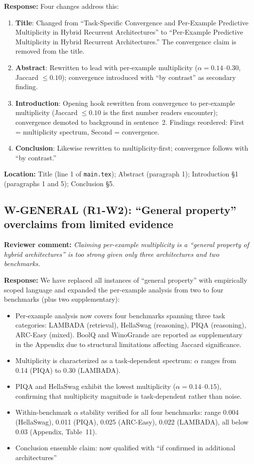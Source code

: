 \documentclass[11pt]{article}
\newcommand{\reviewer}[1]{\textcolor{reviewercolor}{\textbf{Reviewer comment:} \textit{#1}}}
\newcommand{\response}[1]{\textcolor{responsecolor}{\textbf{Response:} #1}}
\newcommand{\location}[1]{\textbf{Location:} #1}
\begin{document}
\response{Four changes address this:}
\begin{enumerate}[leftmargin=2em]
\item \textbf{Title}: Changed from ``Task-Specific Convergence and Per-Example Predictive Multiplicity in Hybrid Recurrent Architectures'' to ``Per-Example Predictive Multiplicity in Hybrid Recurrent Architectures.'' The convergence claim is removed from the title.
\item \textbf{Abstract}: Rewritten to lead with per-example multiplicity ($\alpha = 0.14$--$0.30$, Jaccard $\leq 0.10$); convergence introduced with ``by contrast'' as secondary finding.
\item \textbf{Introduction}: Opening hook rewritten from convergence to per-example multiplicity (Jaccard $\leq 0.10$ is the first number readers encounter); convergence demoted to background in sentence~2. Findings reordered: First = multiplicity spectrum, Second = convergence.
\item \textbf{Conclusion}: Likewise rewritten to multiplicity-first; convergence follows with ``by contrast.''
\end{enumerate}

\location{Title (line 1 of \texttt{main.tex}); Abstract (paragraph 1); Introduction \S1 (paragraphs 1 and 5); Conclusion \S5.}

\subsection*{W-GENERAL (R1-W2): ``General property'' overclaims from limited evidence}

\reviewer{Claiming per-example multiplicity is a ``general property of hybrid architectures'' is too strong given only three architectures and two benchmarks.}

\response{We have replaced all instances of ``general property'' with empirically scoped language and expanded the per-example analysis from two to four benchmarks (plus two supplementary):}
\begin{itemize}[leftmargin=2em]
\item Per-example analysis now covers four benchmarks spanning three task categories: LAMBADA (retrieval), HellaSwag (reasoning), PIQA (reasoning), ARC-Easy (mixed). BoolQ and WinoGrande are reported as supplementary in the Appendix due to structural limitations affecting Jaccard significance.
\item Multiplicity is characterized as a task-dependent spectrum: $\alpha$ ranges from 0.14 (PIQA) to 0.30 (LAMBADA).
\item PIQA and HellaSwag exhibit the lowest multiplicity ($\alpha = 0.14$--$0.15$), confirming that multiplicity magnitude is task-dependent rather than noise.
\item Within-benchmark $\alpha$ stability verified for all four benchmarks: range 0.004 (HellaSwag), 0.011 (PIQA), 0.025 (ARC-Easy), 0.022 (LAMBADA), all below 0.03 (Appendix, Table~11).
\item Conclusion ensemble claim: now qualified with ``if confirmed in additional architectures''
\end{itemize}
\end{document}
